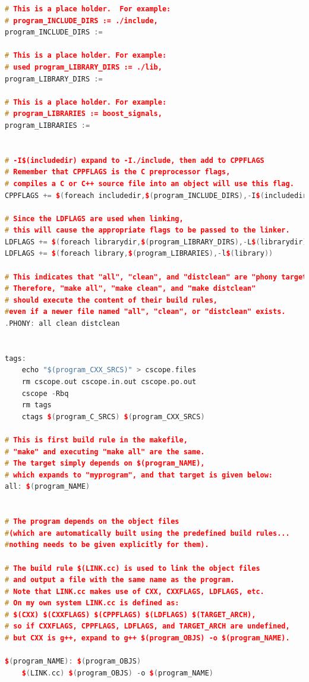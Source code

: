 \documentclass[a4paper,11pt,twoside]{book}
\begin{document}
\begin{itemize}
\begin{lstlisting}[frame=single,  basicstyle=\small, language=c++, mathescape=false]
# This is a place holder.  For example:
# program_INCLUDE_DIRS := ./include, 
program_INCLUDE_DIRS :=

# This is a place holder. For example:
# used program_LIBRARY_DIRS := ./lib, 
program_LIBRARY_DIRS :=

# This is a place holder. For example:
# program_LIBRARIES := boost_signals, 
program_LIBRARIES :=


# -I$(includedir) expand to -I./include, then add to CPPFLAGS
# Remember that CPPFLAGS is the C preprocessor flags, 
# compiles a C or C++ source file into an object will use this flag.
CPPFLAGS += $(foreach includedir,$(program_INCLUDE_DIRS),-I$(includedir))

# Since the LDFLAGS are used when linking, 
# this will cause the appropriate flags to be passed to the linker.
LDFLAGS += $(foreach librarydir,$(program_LIBRARY_DIRS),-L$(librarydir))
LDFLAGS += $(foreach library,$(program_LIBRARIES),-l$(library))

# This indicates that "all", "clean", and "distclean" are "phony targets". 
# Therefore, "make all", "make clean", and "make distclean"
# should execute the content of their build rules, 
#even if a newer file named "all", "clean", or "distclean" exists.
.PHONY: all clean distclean


tags:
	echo "$(program_CXX_SRCS)" > cscope.files 
	rm cscope.out cscope.in.out cscope.po.out 
    cscope -Rbq 
	rm tags
	ctags $(program_C_SRCS) $(program_CXX_SRCS)
	 
# This is first build rule in the makefile, 
# "make" and executing "make all" are the same.
# The target simply depends on $(program_NAME), 
# which expands to "myprogram", and that target is given below:
all: $(program_NAME)


# The program depends on the object files 
#(which are automatically built using the predefined build rules... 
#nothing needs to be given explicitly for them).

# The build rule $(LINK.cc) is used to link the object files
# and output a file with the same name as the program. 
# Note that LINK.cc makes use of CXX, CXXFLAGS, LDFLAGS, etc.
# On my own system LINK.cc is defined as: 
# $(CXX) $(CXXFLAGS) $(CPPFLAGS) $(LDFLAGS) $(TARGET_ARCH),
# so if CXXFLAGS, CPPFLAGS, LDFLAGS, and TARGET_ARCH are undefined,
# but CXX is g++, expand to g++ $(program_OBJS) -o $(program_NAME).

$(program_NAME): $(program_OBJS)
    $(LINK.cc) $(program_OBJS) -o $(program_NAME)


\end{lstlisting}
\end{itemize}
\end{document}
